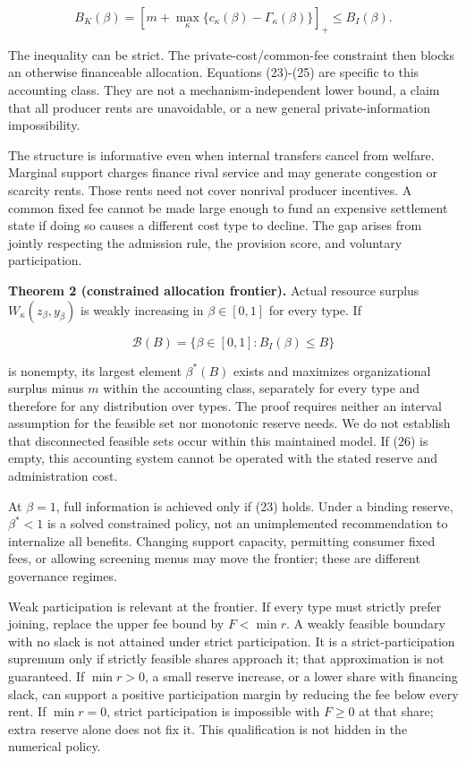 \documentclass[
  11pt,
]{article}
\begin{document}
\[B_K(\beta)=
\left[m+\max_\kappa\{c_\kappa(\beta)-\Gamma_\kappa(\beta)\}\right]_+
\leq B_I(\beta). \tag{25}\]

The inequality can be strict. The private-cost/common-fee constraint
then blocks an otherwise financeable allocation. Equations (23)-(25) are
specific to this accounting class. They are not a mechanism-independent
lower bound, a claim that all producer rents are unavoidable, or a new
general private-information impossibility.

The structure is informative even when internal transfers cancel from
welfare. Marginal support charges finance rival service and may generate
congestion or scarcity rents. Those rents need not cover nonrival
producer incentives. A common fixed fee cannot be made large enough to
fund an expensive settlement state if doing so causes a different cost
type to decline. The gap arises from jointly respecting the admission
rule, the provision score, and voluntary participation.

\textbf{Theorem 2 (constrained allocation frontier).} Actual resource
surplus \(W_\kappa(z_\beta,y_\beta)\) is weakly increasing in
\(\beta\in[0,1]\) for every type. If

\[\mathcal B(B)=\{\beta\in[0,1]:B_I(\beta)\leq B\} \tag{26}\]

is nonempty, its largest element \(\beta^*(B)\) exists and maximizes
organizational surplus minus \(m\) within the accounting class,
separately for every type and therefore for any distribution over types.
The proof requires neither an interval assumption for the feasible set
nor monotonic reserve needs. We do not establish that disconnected
feasible sets occur within this maintained model. If (26) is empty, this
accounting system cannot be operated with the stated reserve and
administration cost.

At \(\beta=1\), full information is achieved only if (23) holds. Under a
binding reserve, \(\beta^*<1\) is a solved constrained policy, not an
unimplemented recommendation to internalize all benefits. Changing
support capacity, permitting consumer fixed fees, or allowing screening
menus may move the frontier; these are different governance regimes.

Weak participation is relevant at the frontier. If every type must
strictly prefer joining, replace the upper fee bound by \(F<\min r\). A
weakly feasible boundary with no slack is not attained under strict
participation. It is a strict-participation supremum only if strictly
feasible shares approach it; that approximation is not guaranteed. If
\(\min r>0\), a small reserve increase, or a lower share with financing
slack, can support a positive participation margin by reducing the fee
below every rent. If \(\min r=0\), strict participation is impossible
with \(F\geq0\) at that share; extra reserve alone does not fix it. This
qualification is not hidden in the numerical policy.
\end{document}

